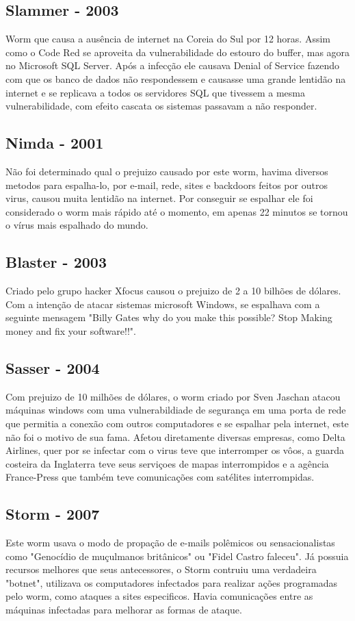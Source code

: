 \subsection{Slammer - 2003}

	Worm que causa a ausência de internet na Coreia do Sul por 12 horas. Assim como o Code Red se aproveita da vulnerabilidade do estouro do buffer, mas agora no Microsoft SQL Server. Após a infecção ele causava Denial of Service fazendo com que os banco de dados não respondessem e causasse uma grande lentidão na internet e se replicava a todos os servidores SQL que tivessem a mesma vulnerabilidade, com efeito cascata os sistemas passavam a não responder.

\subsection{Nimda - 2001}
	Não foi determinado qual o prejuizo causado por este worm, havima diversos metodos para espalha-lo, por e-mail, rede, sites e backdoors feitos por outros virus, causou muita lentidão na internet. Por conseguir se espalhar ele  foi considerado o worm mais rápido até o momento, em apenas 22 minutos se tornou o vírus mais espalhado do mundo.

\subsection{Blaster - 2003}
	Criado pelo grupo hacker Xfocus causou o prejuizo de 2 a 10 bilhões de dólares. Com a intenção de atacar sistemas microsoft Windows, se espalhava com a seguinte mensagem "Billy Gates why do you make this possible? Stop Making money and fix your software!!".
\subsection{Sasser - 2004}
	Com prejuizo de 10 milhões de dólares, o worm criado por Sven Jaschan atacou máquinas windows com uma vulnerabildiade de segurança em uma porta de rede que permitia a conexão com outros computadores e se espalhar pela internet, este não foi o motivo de sua fama. Afetou diretamente diversas empresas, como Delta Airlines, quer por se infectar com o virus teve que interromper os vôos, a guarda costeira da Inglaterra teve seus serviçoes de mapas interrompidos e a agência France-Press que também teve comunicações com satélites interrompidas.
\subsection{Storm - 2007}
	Este worm usava o modo de propação de e-mails polêmicos ou sensacionalistas como "Genocídio de muçulmanos britânicos" ou "Fidel Castro faleceu". Já possuia recursos melhores que seus antecessores, o Storm contruiu uma verdadeira "botnet", utilizava os computadores infectados para realizar ações programadas pelo worm, como ataques a sites especificos. Havia comunicações entre as máquinas infectadas para melhorar as formas de ataque.


